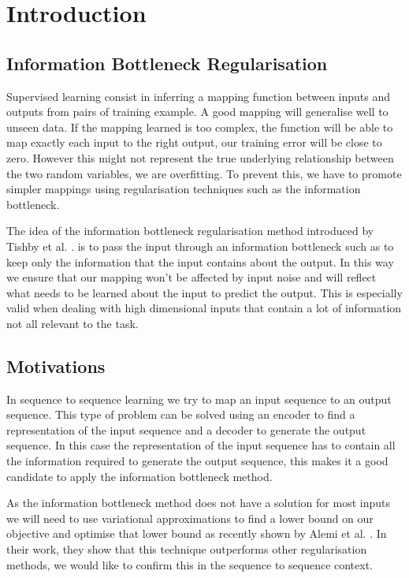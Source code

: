 \documentclass[11pt,oneside,openright]{report}
\begin{document}
\tableofcontents

\chapter{Introduction}

\section{Information Bottleneck Regularisation}
Supervised learning consist in inferring a mapping function between inputs and outputs from pairs of training example. A good mapping will generalise well to unseen data. If the mapping learned is too complex, the function will be able to map exactly each input to the right output, our training error will be close to zero. However this might not represent the true underlying relationship between the two random variables, we are overfitting. To prevent this, we have to promote simpler mappings using regularisation techniques such as the information bottleneck. 

The idea of the information bottleneck regularisation method introduced by Tishby et al. \cite{tishby}. is to pass the input through an information bottleneck such as to keep only the information that the input contains about the output. In this way we ensure that our mapping won't be affected by input noise and will reflect what needs to be learned about the input to predict the output. This is especially valid when dealing with high dimensional inputs that contain a lot of information not all relevant to the task.

\section{Motivations}
In sequence to sequence learning we try to map an input sequence to an output sequence. This type of problem can be solved using an encoder to find a representation of the input sequence and a decoder to generate the output sequence. In this case the representation of the input sequence has to contain all the information required to generate the output sequence, this makes it a good candidate to apply the information bottleneck method.

As the information bottleneck method does not have a solution for most inputs we will need to use variational approximations to find a lower bound on our objective and optimise that lower bound as recently shown by Alemi et al. \cite{vib}. In their work, they show that this technique outperforms other regularisation methods, we would like to confirm this in the sequence to sequence context.
 
\end{document}
